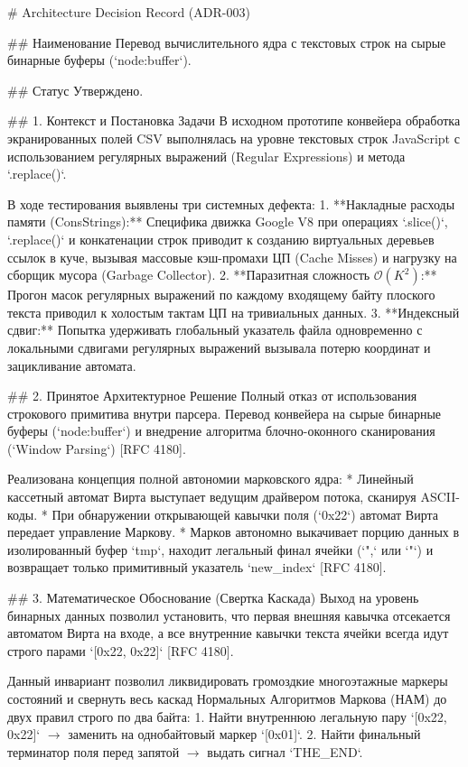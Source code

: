 # Architecture Decision Record (ADR-003)

## Наименование
Перевод вычислительного ядра с текстовых строк на сырые бинарные буферы (`node:buffer`).

## Статус
Утверждено.

## 1. Контекст и Постановка Задачи
В исходном прототипе конвейера обработка экранированных полей CSV выполнялась на уровне текстовых строк JavaScript с использованием регулярных выражений (Regular Expressions) и метода `.replace()`. 

В ходе тестирования выявлены три системных дефекта:
1. **Накладные расходы памяти (ConsStrings):** Специфика движка Google V8 при операциях `.slice()`, `.replace()` и конкатенации строк приводит к созданию виртуальных деревьев ссылок в куче, вызывая массовые кэш-промахи ЦП (Cache Misses) и нагрузку на сборщик мусора (Garbage Collector).
2. **Паразитная сложность $\mathcal{O}(K^2)$:** Прогон масок регулярных выражений по каждому входящему байту плоского текста приводил к холостым тактам ЦП на тривиальных данных.
3. **Индексный сдвиг:** Попытка удерживать глобальный указатель файла одновременно с локальными сдвигами регулярных выражений вызывала потерю координат и зацикливание автомата.

## 2. Принятое Архитектурное Решение
Полный отказ от использования строкового примитива внутри парсера. Перевод конвейера на сырые бинарные буферы (`node:buffer`) и внедрение алгоритма блочно-оконного сканирования (`Window Parsing`) [RFC 4180].

Реализована концепция полной автономии марковского ядра:
* Линейный кассетный автомат Вирта выступает ведущим драйвером потока, сканируя ASCII-коды.
* При обнаружении открывающей кавычки поля (`0x22`) автомат Вирта передает управление Маркову.
* Марков автономно выкачивает порцию данных в изолированный буфер `tmp`, находит легальный финал ячейки (`",` или `"\n`) и возвращает только примитивный указатель `new_index` [RFC 4180].

## 3. Математическое Обоснование (Свертка Каскада)
Выход на уровень бинарных данных позволил установить, что первая внешняя кавычка отсекается автоматом Вирта на входе, а все внутренние кавычки текста ячейки всегда идут строго парами `[0x22, 0x22]` [RFC 4180].

Данный инвариант позволил ликвидировать громоздкие многоэтажные маркеры состояний и свернуть весь каскад Нормальных Алгоритмов Маркова (НАМ) до двух правил строго по два байта:
1. Найти внутреннюю легальную пару `[0x22, 0x22]` $\rightarrow$ заменить на однобайтовый маркер `[0x01]`.
2. Найти финальный терминатор поля перед запятой $\rightarrow$ выдать сигнал `THE_END`.

